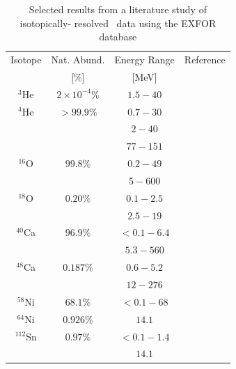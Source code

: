 \begin{table}[ht]
    \caption{Selected results from a literature study of isotopically-
        resolved \tot\ data using the EXFOR database \cite{EXFORDatabase}}
    \label{IsotopicCrossSectionTable}
    \begin{center}
        \begin{tabular}{ c c c c }
            \hline
            Isotope & Nat. Abund. & Energy Range & Reference\\
                    & [\%] & [MeV] & \\

            \hline

            $^{3}$He & $2\times 10^{-4}\%$ & $1.5 - 40$ & \cite{Haesner1983}\\
            $^{4}$He & $>99.9\%$ & $0.7-30$ & \cite{Goulding1973}\\
            & & $2-40$ & \cite{Haesner1983}\\
            & & $77-151$ & \cite{Measday1966}\\

            $^{16}$O & $99.8\%$ & $0.2-49$ & \cite{Perey1972}\\
            & & $5-600$ & \cite{Finlay1993}\\

            $^{18}$O & $0.20\%$ & $0.1-2.5$ & \cite{Vaughn1965}\\
            & & $2.5-19$ & \cite{Salisbury1965}\\

            $^{40}$Ca & $96.9\%$ & $<0.1-6.4$ & \cite{Johnson1973}\\
            & & $5.3-560$ & \cite{Abfalterer2001}\\

            $^{48}$Ca & $0.187\%$ & $0.6-5.2$ & \cite{Harvey1985}\\
            & & $12-276$ & \cite{Shane2010}\\

            $^{58}$Ni & $68.1\%$ & $<0.1-68$ & \cite{Perey1993}\\

            $^{64}$Ni & $0.926\%$ & $14.1$ & \cite{Dukarevich1967}\\

            $^{112}$Sn & $0.97\%$ & $<0.1-1.4$ & \cite{Timokhov1989}\\
            & & $14.1$ & \cite{Dukarevich1967}\\


\end{tabular}
\end{center}
\end{table}
